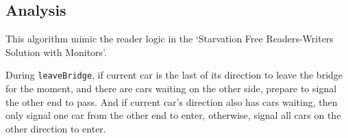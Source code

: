 \documentclass{article}
\begin{document}
\subsection*{Analysis}

This algorithm mimic the reader logic in the `Starvation Free Readers-Writers
Solution with Monitors'.

During \verb|leaveBridge|, if current car is the last of its direction to leave
the bridge for the moment, and there are cars waiting on the other side,
prepare to signal the other end to pass. And if current car's direction also
has cars waiting, then only signal one car from the other end to enter,
otherwise, signal all cars on the other direction to enter.
\end{document}
